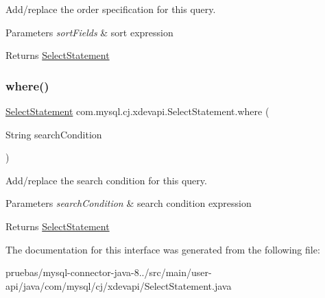 Add/replace the order specification for this query.


\begin{DoxyParams}{Parameters}
{\em sort\+Fields} & sort expression \\
\hline
\end{DoxyParams}
\begin{DoxyReturn}{Returns}
\mbox{\hyperlink{interfacecom_1_1mysql_1_1cj_1_1xdevapi_1_1_select_statement}{Select\+Statement}} 
\end{DoxyReturn}
\mbox{\label{interfacecom_1_1mysql_1_1cj_1_1xdevapi_1_1_select_statement_af8a0e6c10a2091b4e6a8d6ae74e5713f}} 
\subsubsection{\texorpdfstring{where()}{where()}}
{\footnotesize\ttfamily \mbox{\hyperlink{interfacecom_1_1mysql_1_1cj_1_1xdevapi_1_1_select_statement}{Select\+Statement}} com.\+mysql.\+cj.\+xdevapi.\+Select\+Statement.\+where (\begin{DoxyParamCaption}\item[{String}]{search\+Condition }\end{DoxyParamCaption})}

Add/replace the search condition for this query.


\begin{DoxyParams}{Parameters}
{\em search\+Condition} & search condition expression \\
\hline
\end{DoxyParams}
\begin{DoxyReturn}{Returns}
\mbox{\hyperlink{interfacecom_1_1mysql_1_1cj_1_1xdevapi_1_1_select_statement}{Select\+Statement}} 
\end{DoxyReturn}


The documentation for this interface was generated from the following file\+:\begin{DoxyCompactItemize}
\item 
pruebas/mysql-\/connector-\/java-\/8../src/main/user-\/api/java/com/mysql/cj/xdevapi/Select\+Statement.\+java\end{DoxyCompactItemize}
